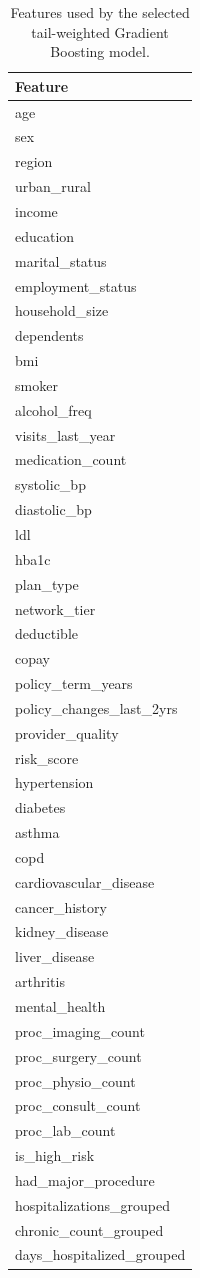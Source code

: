 \begin{table}
\caption{Features used by the selected tail-weighted Gradient Boosting model.}
\label{tab:06-selected-mean-features}
\begin{tabular}{l}
\toprule
Feature \\
\midrule
age \\
sex \\
region \\
urban_rural \\
income \\
education \\
marital_status \\
employment_status \\
household_size \\
dependents \\
bmi \\
smoker \\
alcohol_freq \\
visits_last_year \\
medication_count \\
systolic_bp \\
diastolic_bp \\
ldl \\
hba1c \\
plan_type \\
network_tier \\
deductible \\
copay \\
policy_term_years \\
policy_changes_last_2yrs \\
provider_quality \\
risk_score \\
hypertension \\
diabetes \\
asthma \\
copd \\
cardiovascular_disease \\
cancer_history \\
kidney_disease \\
liver_disease \\
arthritis \\
mental_health \\
proc_imaging_count \\
proc_surgery_count \\
proc_physio_count \\
proc_consult_count \\
proc_lab_count \\
is_high_risk \\
had_major_procedure \\
hospitalizations_grouped \\
chronic_count_grouped \\
days_hospitalized_grouped \\
\bottomrule
\end{tabular}
\end{table}
